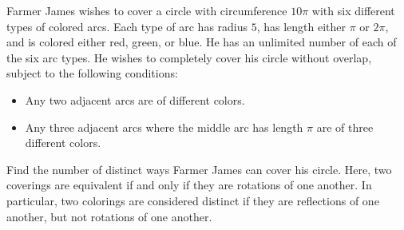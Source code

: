 Farmer James wishes to cover a circle with circumference $10\pi$ with six different types of colored arcs. Each type of arc has radius $5$, has length either $\pi$ or $2\pi$, and is colored either red, green, or blue. He has an unlimited number of each of the six arc types. He wishes to completely cover his circle without overlap, subject to the following conditions:
\begin{itemize}
	\item Any two adjacent arcs are of different colors.
	\item Any three adjacent arcs where the middle arc has length $\pi$ are of three different colors.
\end{itemize}
Find the number of distinct ways Farmer James can cover his circle. Here, two coverings are equivalent if and only if they are rotations of one another. In particular, two colorings are considered distinct if they are reflections of one another, but not rotations of one another.

